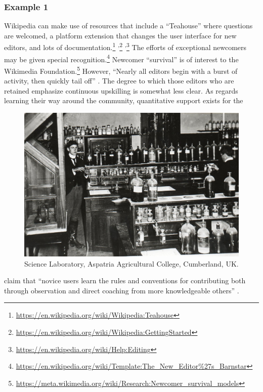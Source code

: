 \subsubsection*{Example 1} Wikipedia  can make use of resources that
include a ``Teahouse'' where questions are welcomed, a platform
extension that changes the user interface for new editors, and lots of
documentation.\footnote{\url{https://en.wikipedia.org/wiki/Wikipedia:Teahouse}}%
\textsuperscript{,}\footnote{\url{https://en.wikipedia.org/wiki/Wikipedia:GettingStarted}}%
\textsuperscript{,}\footnote{\url{https://en.wikipedia.org/wiki/Help:Editing}}
The efforts of exceptional newcomers may be given special
recognition.\footnote{\url{https://en.wikipedia.org/wiki/Template:The_New_Editor\%27s_Barnstar}}
Newcomer ``survival'' is of interest to the Wikimedia
Foundation.\footnote{\url{https://meta.wikimedia.org/wiki/Research:Newcomer_survival_models}}
However, ``Nearly all editors begin with a burst of activity, then
quickly tail off'' \cite{panciera2009wikipedians}.  The degree to
which those editors who are retained emphasize continuous upskilling
is somewhat less clear.  As regards learning their way around the
community, quantitative support exists \cite{panciera2009wikipedians}
for the 
\begin{figure}
\vspace{-.5cm}
\begin{center}
\includegraphics[width=.45\textwidth,trim=0 20 0 20, clip=true]{The_Science_Laboratory}
\end{center}
\vspace{-.5cm}
\captionsetup{font=footnotesize,width=.47\textwidth}
\caption{Science Laboratory, Aspatria Agricultural College, Cumberland, UK. 
\label{science-laboratory}}
\vspace{-.9cm}
\end{figure}
claim that ``novice users learn the rules and conventions
for
contributing both through observation and direct coaching from more
knowledgeable others'' \cite{bryant2005becoming}.


